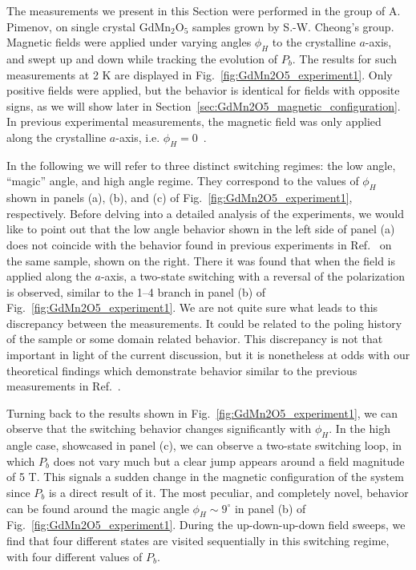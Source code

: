 The measurements we present in this Section were performed in the group of A. Pimenov, on single crystal GdMn$_2$O$_5$ samples grown by S.-W. Cheong's group.
Magnetic fields were applied under varying angles $\phi_H$ to the crystalline $a$-axis, and swept up and down while tracking the evolution of $P_b$.
The results for such measurements at 2 K are displayed in Fig.~\ref{fig:GdMn2O5_experiment1}.
Only positive fields were applied, but the behavior is identical for fields with opposite signs, as we will show later in Section~\ref{sec:GdMn2O5_magnetic_configuration}. 
In previous experimental measurements, the magnetic field was only applied along the crystalline $a$-axis, i.e. $\phi_H = 0$~\cite{Lee13}.

In the following we will refer to three distinct switching regimes: the low angle, ``magic'' angle, and high angle regime.
They correspond to the values of $\phi_H$ shown in panels (a), (b), and (c) of Fig.~\ref{fig:GdMn2O5_experiment1}, respectively.
Before delving into a detailed analysis of the experiments, we would like to point out that the low angle behavior shown in the left side of panel (a) does not coincide with the behavior found in previous experiments in Ref.~\cite{Lee13} on the same sample, shown on the right.
There it was found that when the field is applied along the $a$-axis, a two-state switching with a reversal of the polarization is observed, similar to the 1--4 branch in panel (b) of Fig.~\ref{fig:GdMn2O5_experiment1}.
We are not quite sure what leads to this discrepancy between the measurements. It could be related to the poling history of the sample or some domain related behavior.
This discrepancy is not that important in light of the current discussion, but it is nonetheless at odds with our theoretical findings which demonstrate behavior similar to the previous measurements in Ref.~\cite{Lee13}. 

Turning back to the results shown in Fig.~\ref{fig:GdMn2O5_experiment1}, we can observe that the switching behavior changes significantly with $\phi_H$.
In the high angle case, showcased in panel (c), we can observe a two-state switching loop, in which $P_b$ does not vary much but a clear jump appears around a field magnitude of 5 T.
This signals a sudden change in the magnetic configuration of the system since $P_b$ is a direct result of it.
The most peculiar, and completely novel, behavior can be found around the magic angle $\phi_H \sim 9^\circ$ in panel (b) of Fig.~\ref{fig:GdMn2O5_experiment1}.
During the up-down-up-down field sweeps, we find that four different states are visited sequentially in this switching regime, with four different values of $P_b$.

